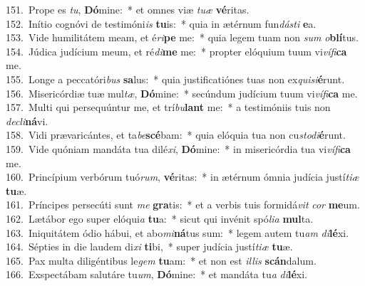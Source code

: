 {151.~}Prope es \textit{tu}, \textbf{Dó}mine:~* et omnes viæ \textit{tu}\textit{æ} \textbf{vé}ritas.\\
{152.~}Inítio cognóvi de testimóni\textit{is} \textbf{tu}is:~* quia in ætérnum fun\textit{dá}\textit{sti} \textbf{e}a.\\
{153.~}Vide humilitátem meam, et é\textit{ri}\textbf{pe} me:~* quia legem tuam non \textit{sum} \textit{o}\textbf{blí}tus.\\
{154.~}Júdica judícium meum, et ré\textit{di}\textbf{me} me:~* propter elóquium tuum vi\textit{ví}\textit{fi}\textbf{ca} me.\\
{155.~}Longe a peccatóri\textit{bus} \textbf{sa}lus:~* quia justificatiónes tuas non ex\textit{qui}\textit{si}\textbf{é}runt.\\
{156.~}Misericórdiæ tuæ mul\textit{tæ}, \textbf{Dó}mine:~* secúndum judícium tuum vi\textit{ví}\textit{fi}\textbf{ca} me.\\
{157.~}Multi qui persequúntur me, et trí\textit{bu}\textbf{lant} me:~* a testimóniis tuis non \textit{de}\textit{cli}\textbf{ná}vi.\\
{158.~}Vidi prævaricántes, et ta\textit{be}\textbf{scé}bam:~* quia elóquia tua non cu\textit{sto}\textit{di}\textbf{é}runt.\\
{159.~}Vide quóniam mandáta tua dilé\textit{xi}, \textbf{Dó}mine:~* in misericórdia tua vi\textit{ví}\textit{fi}\textbf{ca} me.\\
{160.~}Princípium verbórum tuó\textit{rum}, \textbf{vé}ritas:~* in ætérnum ómnia judícia justí\textit{ti}\textit{æ} \textbf{tu}æ.\\
{161.~}Príncipes persecúti sunt \textit{me} \textbf{gra}tis:~* et a verbis tuis formidá\textit{vit} \textit{cor} \textbf{me}um.\\
{162.~}Lætábor ego super elóqui\textit{a} \textbf{tu}a:~* sicut qui invénit spó\textit{li}\textit{a} \textbf{mul}ta.\\
{163.~}Iniquitátem ódio hábui, et abo\textit{mi}\textbf{ná}tus sum:~* legem autem tu\textit{am} \textit{di}\textbf{lé}xi.\\
{164.~}Sépties in die laudem di\textit{xi} \textbf{ti}bi,~* super judícia justí\textit{ti}\textit{æ} \textbf{tu}æ.\\
{165.~}Pax multa diligéntibus le\textit{gem} \textbf{tu}am:~* et non est \textit{il}\textit{lis} \textbf{scán}dalum.\\
{166.~}Exspectábam salutáre tu\textit{um}, \textbf{Dó}mine:~* et mandáta tu\textit{a} \textit{di}\textbf{lé}xi.\\
